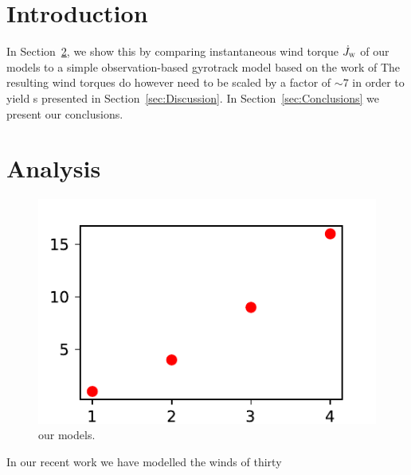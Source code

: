 



\section{Introduction}

In Section~\ref{sec:analysis}, we show this by comparing instantaneous wind torque \(\dot J_{\textsc{w}}\) of our models to a simple observation-based gyrotrack model based on the work of
The resulting wind torques do however need to be scaled by a factor of \(\sim 7\) in order to yield s presented in Section~\ref{sec:Discussion}.
In Section~\ref{sec:Conclusions} we present our conclusions.



%
%
\section{Analysis}\label{sec:analysis}
\begin{figure}
    \centering
    \includegraphics{figures/placeholder.pdf}
    \caption{
        our models.
    }\label{fig:torque}
\end{figure}


In our recent work we have modelled the winds of thirty



